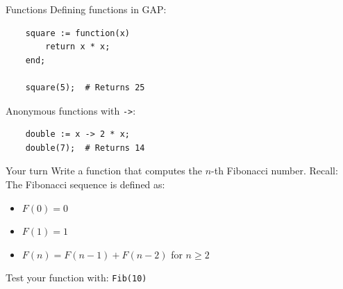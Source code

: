 \documentclass{beamer}
\begin{document}
\begin{frame}[fragile]{Functions}
    Defining functions in GAP:
    \begin{verbatim}
    square := function(x)
        return x * x;
    end;
    
    square(5);  # Returns 25
    \end{verbatim}
    \pause
    Anonymous functions with \verb|->|:
    \begin{verbatim}
    double := x -> 2 * x;
    double(7);  # Returns 14
    \end{verbatim}
\end{frame}

\begin{frame}[fragile]{Your turn}
    Write a function that computes the $n$-th Fibonacci number.
    \bigbreak
    Recall: The Fibonacci sequence is defined as:
    \begin{itemize}
        \item $F(0) = 0$
        \item $F(1) = 1$
        \item $F(n) = F(n-1) + F(n-2)$ for $n \geq 2$
    \end{itemize}
    \bigbreak
    Test your function with: \verb|Fib(10)|
\end{frame}
\end{document}
